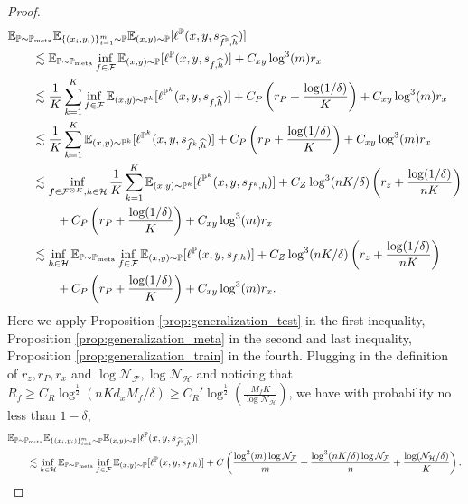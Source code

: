 \documentclass[11pt]{article}
\numberwithin{equation}{section}
\newcommand{\Pmeta}{\mathbb{P}_{\text{meta}}}
\renewcommand{\P}{\mathbb{P}}
\begin{document}
\begin{proof}
    \begin{equation}
        \begin{aligned}
            &\E_{\P\sim\Pmeta}\E_{\{(x_i,y_i)\}_{i=1}^m\sim \P} \E_{(x,y)\sim\P} [\ell^\P(x,y,s_{\widehat{f}^\P,\widehat{h}})] \\
            &\qquad \lesssim \E_{\P\sim\Pmeta} \inf_{f\in\mathcal{F}} \E_{(x,y)\sim\P} [\ell^\P(x,y,s_{f,\widehat{h}})]+C_{xy}\log^3(m)r_x \\
            &\qquad \lesssim \frac{1}{K}\sum_{k=1}^K\inf_{f\in\mathcal{F}} \E_{(x,y)\sim\P^k} [\ell^{\P^k}(x,y,s_{f,\widehat{h}})]+C_P\left(r_P+\frac{\log(1/\delta)}{K}\right)+C_{xy}\log^3(m)r_x \\
            &\qquad \lesssim \frac{1}{K}\sum_{k=1}^K \E_{(x,y)\sim\P^k} [\ell^{\P^k}(x,y,s_{\widehat{f}^k,\widehat{h}})]+C_P\left(r_P+\frac{\log(1/\delta)}{K}\right)+C_{xy}\log^3(m)r_x \\
            &\qquad \lesssim \inf_{\vf\in\mathcal{F}^{\otimes K},h\in\mathcal{H}} \frac{1}{K}\sum_{k=1}^K \E_{(x,y)\sim\P^k} [\ell^{\P^k}(x,y,s_{f^k,h})]+C_Z\log^3(nK/\delta)\left(r_z+\frac{\log(1/\delta)}{nK}\right) \\
            &\qquad\qquad +C_P\left(r_P+\frac{\log(1/\delta)}{K}\right)+C_{xy}\log^3(m)r_x \\
            &\qquad \lesssim \inf_{h\in\mathcal{H}} \E_{\P\sim\Pmeta} \inf_{f\in\mathcal{F}}\E_{(x,y)\sim\P} [\ell^\P (x,y,s_{f,h})]+C_Z\log^3(nK/\delta)\left(r_z+\frac{\log(1/\delta)}{nK}\right) \\
            &\qquad\qquad +C_P\left(r_P+\frac{\log(1/\delta)}{K}\right)+C_{xy}\log^3(m)r_x.
        \end{aligned}
    \end{equation}
    Here we apply Proposition \ref{prop:generalization_test} in the first inequality, Proposition \ref{prop:generalization_meta} in the second and last inequality, Proposition \ref{prop:generalization_train} in the fourth. 
    Plugging in the definition of $r_z,r_P,r_x$ and $\log\mathcal{N}_\mathcal{F},\log\mathcal{N}_\mathcal{H}$ and
    noticing that $R_f\geq C_R\log^{\frac{1}{2}}(nKd_xM_f/\delta)\geq C_R'\log^{\frac{1}{2}}\left(\frac{M_fK}{\log\mathcal{N}_\mathcal{H}}\right)$, we have with probability no less than $1-\delta$,
    \begin{equation}
        \begin{aligned}
            &\E_{\P\sim\Pmeta}\E_{\{(x_i,y_i)\}_{i=1}^m\sim \P} \E_{(x,y)\sim\P} [\ell^\P(x,y,s_{\widehat{f}^\P,\widehat{h}})] \\
            &\qquad \lesssim \inf_{h\in\mathcal{H}} \E_{\P\sim\Pmeta} \inf_{f\in\mathcal{F}}\E_{(x,y)\sim\P} [\ell^\P (x,y,s_{f,h})] + C \left(\frac{\log^3(m)\log\mathcal{N}_\mathcal{F}}{m} + \frac{\log^3(nK/\delta)\log\mathcal{N}_\mathcal{F}}{n}+\frac{\log(\mathcal{N}_\mathcal{H}/\delta)}{K}\right).
        \end{aligned}
    \end{equation}
\end{proof}
\end{document}
